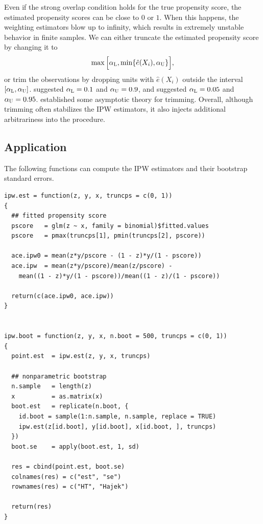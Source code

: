 Even if the strong overlap condition holds for the true propensity score, the estimated propensity scores can be close to $0$ or $1$. 
When this happens, the weighting estimators blow up to infinity, which results in extremely unstable behavior in finite samples. We can either truncate the estimated propensity score by changing it to
$$
 \max\Big[  \alpha_\textsc{L},   \min\{   \hat{e}(X_i), \alpha_\textsc{U} \}   \Big] ,
$$
or trim the observations by dropping units with $\hat{e}(X_i)$ outside the interval $[\alpha_\textsc{L},   \alpha_\textsc{U}  ]$. \citet{crump2009dealing} suggested $  \alpha_\textsc{L} = 0.1$ and $\alpha_\textsc{U} = 0.9 $, and \citet{kurth2005results} suggested $  \alpha_\textsc{L} = 0.05$ and $\alpha_\textsc{U} = 0.95 $. \citet{yang2018asymptotic} established some asymptotic theory for trimming. Overall, although trimming often stabilizes the IPW estimators, it also injects additional arbitrariness into the procedure. 




 \subsection{Application}\label{sec::application-pscore-weighting}


The following functions can compute the IPW estimators and their bootstrap standard errors. 
\begin{lstlisting}
ipw.est = function(z, y, x, truncps = c(0, 1))
{
  ## fitted propensity score
  pscore   = glm(z ~ x, family = binomial)$fitted.values
  pscore   = pmax(truncps[1], pmin(truncps[2], pscore))
  
  ace.ipw0 = mean(z*y/pscore - (1 - z)*y/(1 - pscore))
  ace.ipw  = mean(z*y/pscore)/mean(z/pscore) - 
    mean((1 - z)*y/(1 - pscore))/mean((1 - z)/(1 - pscore))
  
  return(c(ace.ipw0, ace.ipw))     
}


ipw.boot = function(z, y, x, n.boot = 500, truncps = c(0, 1))
{
  point.est  = ipw.est(z, y, x, truncps)
  
  ## nonparametric bootstrap
  n.sample   = length(z)
  x          = as.matrix(x)
  boot.est   = replicate(n.boot, {
    id.boot = sample(1:n.sample, n.sample, replace = TRUE)
    ipw.est(z[id.boot], y[id.boot], x[id.boot, ], truncps)
  })
  boot.se    = apply(boot.est, 1, sd)
  
  res = cbind(point.est, boot.se)
  colnames(res) = c("est", "se")
  rownames(res) = c("HT", "Hajek")
  
  return(res)
}
\end{lstlisting}

